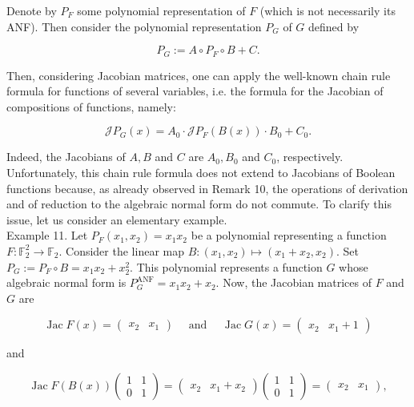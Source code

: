 \documentclass[10pt]{article}
\begin{document}
Denote by $P_{F}$ some polynomial representation of $F$ (which is not necessarily its ANF). Then consider the polynomial representation $P_{G}$ of $G$ defined by

$$
P_{G}:=A \circ P_{F} \circ B+C .
$$

Then, considering Jacobian matrices, one can apply the well-known chain rule formula for functions of several variables, i.e. the formula for the Jacobian of compositions of functions, namely:


\begin{equation*}
\mathscr{J} P_{G}(x)=A_{0} \cdot \mathscr{J} P_{F}(B(x)) \cdot B_{0}+C_{0} . \tag{2}
\end{equation*}


Indeed, the Jacobians of $A, B$ and $C$ are $A_{0}, B_{0}$ and $C_{0}$, respectively. Unfortunately, this chain rule formula does not extend to Jacobians of Boolean functions because, as already observed in Remark 10, the operations of derivation and of reduction to the algebraic normal form do not commute. To clarify this issue, let us consider an elementary example.\\
Example 11. Let $P_{F}\left(x_{1}, x_{2}\right)=x_{1} x_{2}$ be a polynomial representing a function $F: \mathbb{F}_{2}^{2} \rightarrow \mathbb{F}_{2}$. Consider the linear map $B:\left(x_{1}, x_{2}\right) \mapsto\left(x_{1}+x_{2}, x_{2}\right)$. Set $P_{G}:=P_{F} \circ B=x_{1} x_{2}+x_{2}^{2}$. This polynomial represents a function $G$ whose algebraic normal form is $P_{G}^{\mathrm{ANF}}=x_{1} x_{2}+x_{2}$. Now, the Jacobian matrices of $F$ and $G$ are

$$
\operatorname{Jac} F(x)=\left(\begin{array}{ll}
x_{2} & x_{1}
\end{array}\right) \quad \text { and } \quad \operatorname{Jac} G(x)=\left(\begin{array}{ll}
x_{2} & x_{1}+1
\end{array}\right)
$$

and

$$
\operatorname{Jac} F(B(x))\left(\begin{array}{ll}
1 & 1 \\
0 & 1
\end{array}\right)=\left(\begin{array}{ll}
x_{2} & x_{1}+x_{2}
\end{array}\right)\left(\begin{array}{ll}
1 & 1 \\
0 & 1
\end{array}\right)=\left(\begin{array}{ll}
x_{2} & x_{1}
\end{array}\right),
$$
\end{document}

